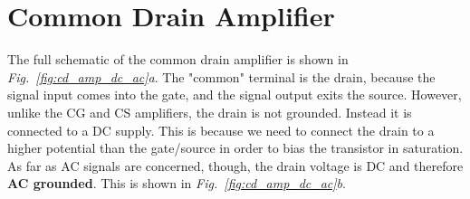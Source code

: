 \section{Common Drain Amplifier}
The full schematic of the common drain amplifier is shown in \emph{Fig.~\ref{fig:cd_amp_dc_ac}a}.  The "common" terminal is the drain, because the signal input comes into the gate, and the signal output exits the source.  However, unlike the CG and CS amplifiers, the drain is not grounded. Instead it is connected to a DC supply.  This is because we need to connect the drain to a higher potential than the gate/source in order to bias the transistor in saturation.  As far as AC signals are concerned, though, the drain voltage is DC and therefore \textbf{AC grounded}.  This is shown in \emph{Fig.~\ref{fig:cd_amp_dc_ac}b}.
